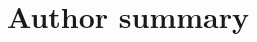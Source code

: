 \documentclass[10pt,letterpaper]{article}
\renewcommand{\vec}[1]{\mathbf{#1}}
\begin{document}
\section*{Author summary}

\linenumbers

\pagebreak


\end{document}
